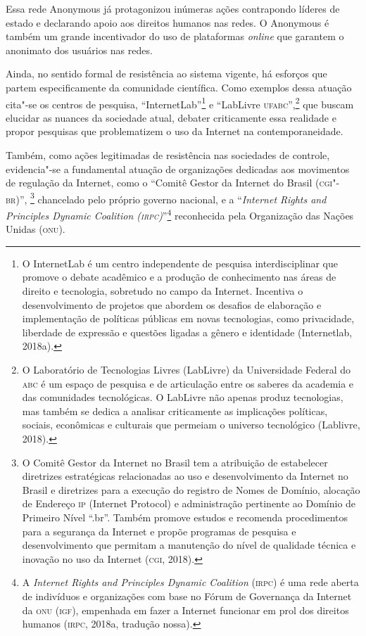Essa rede Anonymous já protagonizou inúmeras ações contrapondo líderes
de estado e declarando apoio aos direitos humanos nas redes. O Anonymous
é também um grande incentivador do uso de plataformas \textit{online} que
garantem o anonimato dos usuários nas redes.

Ainda, no sentido formal de resistência ao sistema vigente, há esforços
que partem especificamente da comunidade científica. Como exemplos dessa
atuação cita"-se os centros de pesquisa, ``InternetLab''\footnote{O
  InternetLab é um centro independente de pesquisa interdisciplinar que
  promove o debate acadêmico e a produção de conhecimento nas áreas de
  direito e tecnologia, sobretudo no campo da Internet. Incentiva o
  desenvolvimento de projetos que abordem os desafios de elaboração e
  implementação de políticas públicas em novas tecnologias, como
  privacidade, liberdade de expressão e questões ligadas a gênero e
  identidade (Internetlab, 2018a).} e ``LabLivre \textsc{ufabc}'',\footnote{O
  Laboratório de Tecnologias Livres (LabLivre) da Universidade Federal
  do \textsc{abc} é um espaço de pesquisa e de articulação entre os saberes da
  academia e das comunidades tecnológicas. O LabLivre não apenas produz
  tecnologias, mas também se dedica a analisar criticamente as
  implicações políticas, sociais, econômicas e culturais que permeiam o
  universo tecnológico (Lablivre, 2018).} que buscam elucidar as
nuances da sociedade atual, debater criticamente essa realidade e propor
pesquisas que problematizem o uso da Internet na contemporaneidade.

Também, como ações legitimadas de resistência nas sociedades de
controle, evidencia"-se a fundamental atuação de organizações dedicadas
aos movimentos de regulação da Internet, como o ``Comitê Gestor da
Internet do Brasil (\textsc{cgi"-br})'', \footnote{O Comitê Gestor da Internet no
  Brasil tem a atribuição de estabelecer diretrizes estratégicas
  relacionadas ao uso e desenvolvimento da Internet no Brasil e
  diretrizes para a execução do registro de Nomes de Domínio, alocação
  de Endereço \textsc{ip} (Internet Protocol) e administração pertinente ao
  Domínio de Primeiro Nível ``.br''. Também promove estudos e recomenda
  procedimentos para a segurança da Internet e propõe programas de
  pesquisa e desenvolvimento que permitam a manutenção do nível de
  qualidade técnica e inovação no uso da Internet (\textsc{cgi}, 2018).}
chancelado pelo próprio governo nacional, e a ``\textit{Internet Rights
and Principles Dynamic Coalition (\textsc{irpc})}''\footnote{A \textit{Internet
  Rights and Principles Dynamic Coalition} (\textsc{irpc}) é uma rede aberta de
  indivíduos e organizações com base no Fórum de Governança da Internet
  da \textsc{onu} (\textsc{igf}), empenhada em fazer a Internet funcionar em prol dos
  direitos humanos (\textsc{irpc}, 2018a, tradução nossa).} reconhecida pela Organização das Nações Unidas (\textsc{onu}).

